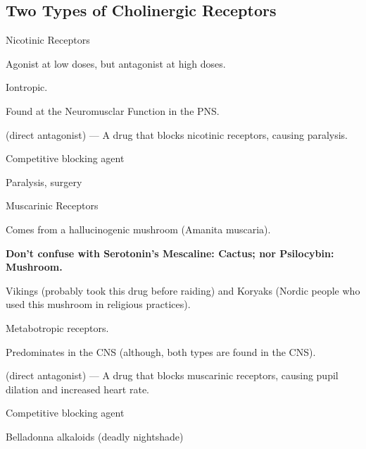 \subsection{Two Types of Cholinergic Receptors}

\begin{coloredlist}
    \item Nicotinic Receptors
    \begin{coloredlist}
        \item Agonist at low doses, but antagonist at high doses.
        \item Iontropic.
        \item Found at the Neuromusclar Function in the PNS.
        \item {} (direct antagonist) — A drug that blocks nicotinic receptors, causing paralysis.
        \begin{coloredlist}
            \item Competitive blocking agent
            \item Paralysis, surgery
        \end{coloredlist}
    \end{coloredlist}
    \item Muscarinic Receptors
    \begin{coloredlist}
        \item Comes from a hallucinogenic mushroom (Amanita muscaria).
        \begin{coloredlist}
            \item \textbf{Don't confuse with Serotonin's Mescaline: Cactus; nor Psilocybin: Mushroom.}
        \end{coloredlist}
        \item Vikings (probably took this drug before raiding) and Koryaks (Nordic people who used this mushroom in religious practices).
        \item Metabotropic receptors.
        \item Predominates in the CNS (although, both types are found in the CNS).
        \item {} (direct antagonist) — A drug that blocks muscarinic receptors, causing pupil dilation and increased heart rate.
        \begin{coloredlist}
            \item Competitive blocking agent
            \item Belladonna alkaloids (deadly nightshade)
        \end{coloredlist}
    \end{coloredlist}
\end{coloredlist}

